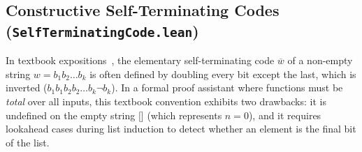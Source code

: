 \documentclass[acmsmall,natbib=false,nonacm]{acmart}
\begin{document}
\subsection{Constructive Self-Terminating Codes (\texttt{SelfTerminatingCode.lean})}
In textbook expositions~\cite{schoning1998gems}, the elementary self-terminating code $\overline{w}$ of a non-empty string $w = b_1 b_2 \dots b_k$ is often defined by doubling every bit except the last, which is inverted ($b_1 b_1 b_2 b_2 \dots b_k \neg b_k$). In a formal proof assistant where functions must be \textit{total} over all inputs, this textbook convention exhibits two drawbacks: it is undefined on the empty string $\texttt{[]}$ (which represents $n = 0$), and it requires lookahead cases during list induction to detect whether an element is the final bit of the list.
\end{document}
